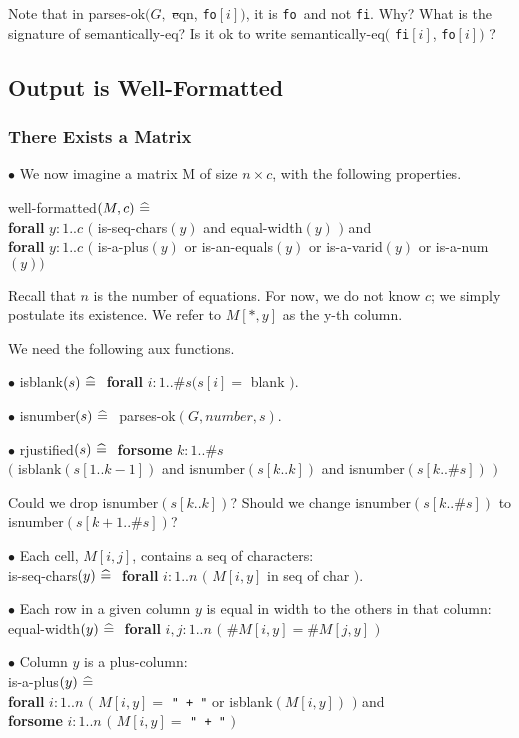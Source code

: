 \documentclass[12pt]{article}
\def\bnf{\st}
\def\zdef{\bf\ \widehat{=}\ }
\def\forall{{\bf forall }}
\def\forsome{{\bf forsome }}
\def\ffi{{\tt fi}}
\def\ffo{{\tt fo}}
\begin{document}
\noindent

{\small Note that in {parses-ok$(G,$ {\bnf eqn}, \ffo$[i])$}, it is \ffo\ and
not \ffi.  Why?  What is the signature of semantically-eq?  Is it
ok to write  semantically-eq$($ \ffi$[i]$, \ffo$[i])$ ?
}

\subsection{Output is Well-Formatted}

\subsubsection{There Exists a Matrix}

$\bullet$
We now imagine a matrix M of size $n \times c$, with the
following properties.

well-formatted$(M, c) \zdef$\\
\forall $y: 1..c$ $($ is-seq-chars$(y)$ and equal-width$(y)$ $)$ and \\
\forall $y: 1..c$
$($ is-a-plus$(y)$ or is-an-equals$(y)$ or is-a-varid$(y)$ or is-a-num$(y)$$)$

Recall that $n$ is the number of equations.  For now, we do not know
$c$; we simply postulate its existence.  We refer to $M[*, y]$ as the
y-th column.

We need the following aux functions.

$\bullet$
isblank$(s) \zdef $ \forall $i: 1..\#s (s[i] = $ {\rm blank} $)$.

$\bullet$
isnumber$(s) \zdef$ parses-ok$(G, number, s)$.

$\bullet$
rjustified$(s) \zdef$ \forsome  $k: 1..\#s$\\
$($ isblank$(s[1 .. k-1])$ and isnumber$(s[k .. k])$ and
isnumber$(s[k .. \#s])$ $)$

{\small Could we drop isnumber$(s[k .. k])$?
Should we change   isnumber$(s[k .. \#s])$ to isnumber$(s[k+1 .. \#s])$?}

$\bullet$
Each cell, $M[i, j]$, contains a seq of characters:\\
is-seq-chars$(y) \zdef $
\forall $i: 1..n$ $($ $M[i, y]$ in seq of char $)$.

$\bullet$
Each row in a given column $y$ is equal in
width to the others in that column:\\
equal-width$(y) \zdef $
\forall $i, j: 1..n$ $($ $\#M[i, y] = \#M[j, y]$ $)$ 

$\bullet$
\noindent
Column $y$ is a plus-column: \\
is-a-plus$(y) \zdef$\\
\forall $i: 1..n$
 $($ $M[i, y] = $ \verb|" + "| or isblank$(M[i, y])$ $)$ and \\
\forsome  $i: 1..n$ $($ $M[i, y] = $ \verb|" + "| $)$
\end{document}
